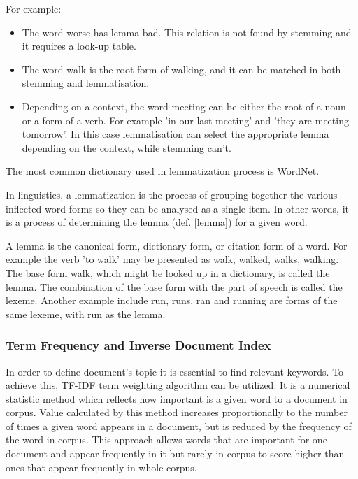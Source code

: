 For example:
\begin{itemize}
	\item The word worse has lemma bad. This relation is not found by stemming and it requires a look-up table.
	\item The word walk is the root form of walking, and it can be matched in both stemming and lemmatisation.
	\item Depending on a context, the word meeting can be either the root of a noun or a form of a verb. For example 'in our last meeting' and 'they are meeting tomorrow'. In this case lemmatisation can select the appropriate lemma depending on the context, while stemming can't.
\end{itemize}

The most common dictionary used in lemmatization process is WordNet.

 \begin{definition}[Lemmatization]
 	\label{lemmatization}
In linguistics, a lemmatization is the process of grouping together the various inflected word forms so they can be analysed as a single item. In other words, it is a process of determining the lemma (def. \ref{lemma}) for a given word.
 \end{definition}
 
  \begin{definition}[Lemma]
  	\label{lemma}
  A lemma is the canonical form, dictionary form, or citation form of a word. For example the verb 'to walk' may be presented as walk, walked, walks, walking. The base form walk, which might be looked up in a dictionary, is called the lemma. The combination of the base form with the part of speech is called the lexeme. Another example include run, runs, ran and running are forms of the same lexeme, with run as the lemma. 
  \end{definition}
 
\subsubsection{Term Frequency and Inverse Document Index}
In order to define document's topic it is essential to find relevant keywords. To achieve this, TF-IDF term weighting algorithm can be utilized. It is a numerical statistic method which reflects how important is a given word to a document in corpus. Value calculated by this method increases proportionally to the number of times a given word appears in a document, but is reduced by the frequency of the word in corpus. This approach allows words that are important for one document and appear frequently in it but rarely in corpus to score higher than ones that appear frequently in whole corpus.

